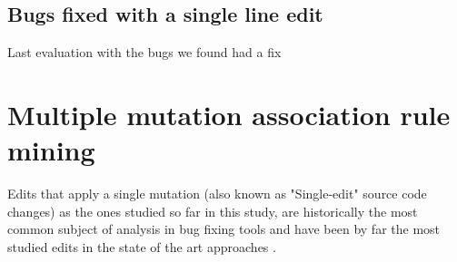 \documentclass[conference]{IEEEtran}
\newcommand{\ra}[1]{\renewcommand{\arraystretch}{#1}}
\begin{document}
\begin{table}\centering
\ra{1.3}
\ra{1.3}
		\caption{Single line bugs With Human Injected Fault Localization}\label{tab:singleLineBugs}
\end{table}



\subsection{Bugs fixed with a single line edit}
Last evaluation with the bugs we found had a fix




\section{Multiple mutation association rule mining}

Edits that apply a single mutation (also known as "Single-edit" source code changes) as the ones studied so far in this study, are historically the most common subject of analysis in bug fixing tools and have been by far the most studied edits in the state of the art approaches \cite{Qi15,fan15,kim2013,Long2016,legoues12,Qi13,Qi14,xuan16}.
\end{document}
